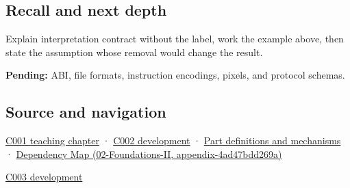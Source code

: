 \subsection{Recall and next depth}\label{recall-and-next-depth}

Explain interpretation contract without the label, work the example above, then state the assumption whose removal would change the result.

\textbf{Pending:} ABI, file formats, instruction encodings, pixels, and protocol schemas.

\subsection{Source and navigation}\label{source-and-navigation}

\href{Continuous\%20Notes/Computing\%20Foundations\%20-\%20From\%20Bits\%20to\%20C++\%20and\%20Systems\%20APIs\#From\%20a\%20signal\%20to\%20an\%20interpretation}{C001 teaching chapter} · \href{Continuous\%20Notes/Computing\%20Foundations\%20-\%20From\%20Bits\%20to\%20C++\%20and\%20Systems\%20APIs\#Arithmetic\%20becomes\%20a\%20policy}{C002 development} · \hyperref[appendix-fd090d982a15]{Part definitions and mechanisms} · \href{}{Dependency Map (02-Foundations-II, appendix-4ad47bdd269a)}

\href{Continuous\%20Notes/Computing\%20Foundations\%20-\%20From\%20Bits\%20to\%20C++\%20and\%20Systems\%20APIs\#Where\%20the\%20bytes\%20live}{C003 development}
